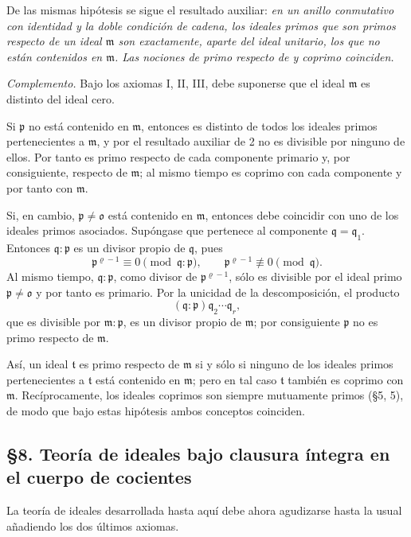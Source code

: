\documentclass[11pt]{article}
\providecommand{\mm}{\mathfrak{m}}
\providecommand{\mo}{\mathfrak{o}}
\providecommand{\mpideal}{\mathfrak{p}}
\providecommand{\mq}{\mathfrak{q}}
\providecommand{\mt}{\mathfrak{t}}
\begin{document}
De las mismas hipótesis se sigue el resultado auxiliar: \emph{en un anillo conmutativo con identidad y la doble condición de cadena, los ideales primos que son primos respecto de un ideal $\mm$ son exactamente, aparte del ideal unitario, los que no están contenidos en $\mm$. Las nociones de primo respecto de y coprimo coinciden.}

\emph{Complemento.} Bajo los axiomas I, II, III, debe suponerse que el ideal $\mm$ es distinto del ideal cero.

Si $\mpideal$ no está contenido en $\mm$, entonces es distinto de todos los ideales primos pertenecientes a $\mm$, y por el resultado auxiliar de 2 no es divisible por ninguno de ellos. Por tanto es primo respecto de cada componente primario y, por consiguiente, respecto de $\mm$; al mismo tiempo es coprimo con cada componente y por tanto con $\mm$.

Si, en cambio, $\mpideal\ne\mo$ está contenido en $\mm$, entonces debe coincidir con uno de los ideales primos asociados. Supóngase que pertenece al componente $\mq=\mq_1$. Entonces $\mq:\mpideal$ es un divisor propio de $\mq$, pues
\[
        \mpideal^{\varrho-1}\equiv0\pmod{\mq:\mpideal},\qquad
        \mpideal^{\varrho-1}\not\equiv0\pmod{\mq}.
\]
Al mismo tiempo, $\mq:\mpideal$, como divisor de $\mpideal^{\varrho-1}$, sólo es divisible por el ideal primo $\mpideal\ne\mo$ y por tanto es primario. Por la unicidad de la descomposición, el producto
\[
        (\mq:\mpideal)\mq_2\cdots\mq_r,
\]
que es divisible por $\mm:\mpideal$, es un divisor propio de $\mm$; por consiguiente $\mpideal$ no es primo respecto de $\mm$.

Así, un ideal $\mt$ es primo respecto de $\mm$ si y sólo si ninguno de los ideales primos pertenecientes a $\mt$ está contenido en $\mm$; pero en tal caso $\mt$ también es coprimo con $\mm$. Recíprocamente, los ideales coprimos son siempre mutuamente primos (§5, 5), de modo que bajo estas hipótesis ambos conceptos coinciden.

\subsection*{§8. Teoría de ideales bajo clausura íntegra en el cuerpo de cocientes}

La teoría de ideales desarrollada hasta aquí debe ahora agudizarse hasta la usual añadiendo los dos últimos axiomas.
\end{document}
